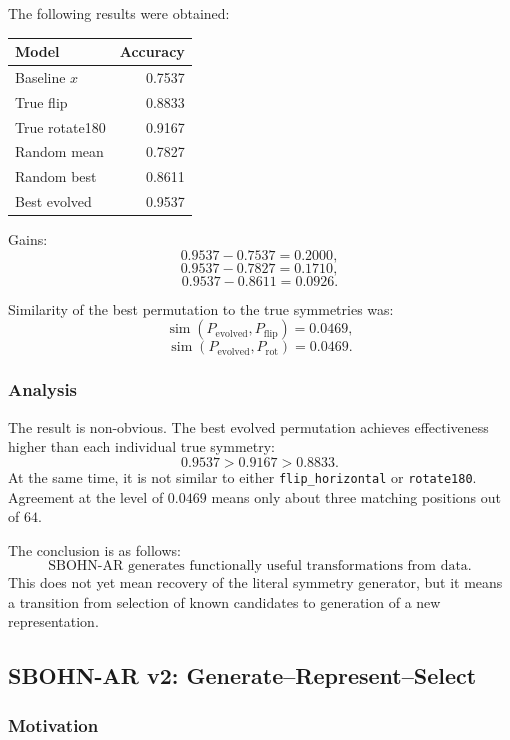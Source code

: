 \documentclass[11pt,a4paper]{report}
\begin{document}
The following results were obtained:

\begin{center}
\begin{tabular}{lr}
\toprule
Model & Accuracy \\
\midrule
Baseline $x$ & 0.7537 \\
True flip & 0.8833 \\
True rotate180 & 0.9167 \\
Random mean & 0.7827 \\
Random best & 0.8611 \\
Best evolved & 0.9537 \\
\bottomrule
\end{tabular}
\end{center}

Gains:
\[
0.9537-0.7537=0.2000,
\]
\[
0.9537-0.7827=0.1710,
\]
\[
0.9537-0.8611=0.0926.
\]

Similarity of the best permutation to the true symmetries was:
\[
\operatorname{sim}(P_{\mathrm{evolved}},P_{\mathrm{flip}})=0.0469,
\]
\[
\operatorname{sim}(P_{\mathrm{evolved}},P_{\mathrm{rot}})=0.0469.
\]

\subsubsection{Analysis}

The result is non-obvious. The best evolved permutation achieves effectiveness higher than each individual true symmetry:
\[
0.9537 > 0.9167 > 0.8833.
\]
At the same time, it is not similar to either \texttt{flip\_horizontal} or \texttt{rotate180}. Agreement at the level of $0.0469$ means only about three matching positions out of $64$.

The conclusion is as follows:
\[
\boxed{\text{SBOHN-AR generates functionally useful transformations from data.}}
\]
This does not yet mean recovery of the literal symmetry generator, but it means a transition from selection of known candidates to generation of a new representation.

\subsection{SBOHN-AR v2: Generate--Represent--Select}

\subsubsection{Motivation}
\end{document}
